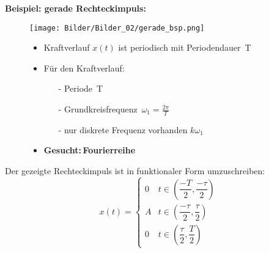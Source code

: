 \textbf{Beispiel: gerade Rechteckimpuls:}\\
\begin{figure}[H]
    \centering
    \begin{minipage}{.45\linewidth}
        \centering
        \texttt{[image: Bilder/Bilder\_02/gerade\_bsp.png]}
        \nonumber
    \end{minipage}
    \begin{minipage}{.45\linewidth}
        \begin{itemize}
            \item
            Kraftverlauf $x(t)$ ist periodisch mit Periodendauer\, T
            \item
            Für den Kraftverlauf:
            \begin{itemize}
                \item [-]
                Periode \,T
                \item [-]
                Grundkreisfrequenz\, $\omega_1=\frac{2\pi}{T}$
                \item [-]
                nur diskrete Frequenz vorhanden $k\omega_1$
            \end{itemize}
            \item
            \textbf{Gesucht:\,Fourierreihe}
        \end{itemize}
    \end{minipage}
\end{figure}

Der gezeigte Rechteckimpuls ist in funktionaler Form umzuschreiben:\\
\begin{equation}
    x(t)= \begin{cases}0 & t \in(\dfrac{-T}{2},\dfrac{-\tau}{2}) \\ 
                       A & t \in(\dfrac{-\tau}{2},\dfrac{\tau}{2}) \\ 
                       0 & t \in(\dfrac{\tau}{2},\dfrac{T}{2})\end{cases}
    \nonumber
\end{equation}

